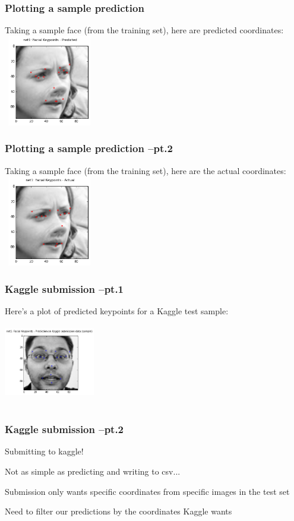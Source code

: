 \documentclass{beamer}
\begin{document}
\begin{frame}[fragile]
\frametitle{Plotting a sample prediction}
Taking a sample face (from the training set), here are predicted coordinates:
\includegraphics[width=150px,height=150px]{net1_sampleprediction_ontrain_predicted.png}
\end{frame}

\begin{frame}[fragile]
\frametitle{Plotting a sample prediction --pt.2}
Taking a sample face (from the training set), here are the actual coordinates:
\includegraphics[width=150px,height=150px]{net1_sampleprediction_ontrain_actual.png}
\end{frame}

\begin{frame}[fragile]
\frametitle{Kaggle submission --pt.1}
Here's a plot of predicted keypoints for a Kaggle test sample:
\includegraphics[width=150px,height=150px]{net1_test_prediction.png}
\end{frame}

\begin{frame}[fragile]
\frametitle{Kaggle submission --pt.2}
\begin{block}{Submitting to kaggle!}
\item Not as simple as predicting and writing to csv...
\item Submission only wants specific coordinates from specific images in the test set
\item Need to filter our predictions by the coordinates Kaggle wants
\end{block}
\end{frame}
\end{document}
